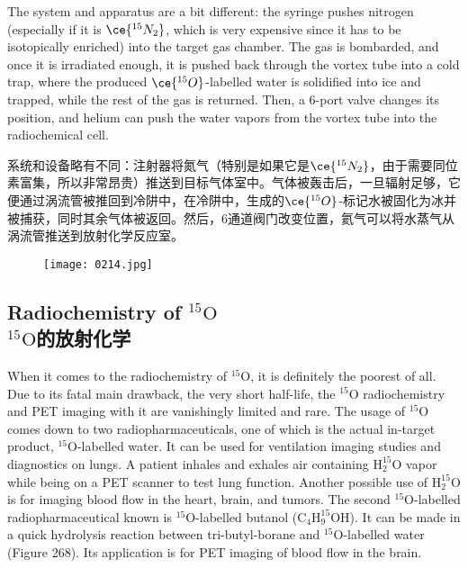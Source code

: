 \documentclass[dvipsnames, svgnames,a4paper,11pt]{article}
\begin{document}
The system and apparatus are a bit different: the syringe pushes nitrogen (especially if it is \(\ce{^{15}N_2}\), which is very expensive since it has to be isotopically enriched) into the target gas chamber. The gas is bombarded, and once it is irradiated enough, it is pushed back through the vortex tube into a cold trap, where the produced \(\ce{^{15}O}\)-labelled water is solidified into ice and trapped, while the rest of the gas is returned. Then, a 6-port valve changes its position, and helium can push the water vapors from the vortex tube into the radiochemical cell.

系统和设备略有不同：注射器将氮气（特别是如果它是\(\ce{^{15}N_2}\)，由于需要同位素富集，所以非常昂贵）推送到目标气体室中。气体被轰击后，一旦辐射足够，它便通过涡流管被推回到冷阱中，在冷阱中，生成的\(\ce{^{15}O}\)-标记水被固化为冰并被捕获，同时其余气体被返回。然后，6通道阀门改变位置，氦气可以将水蒸气从涡流管推送到放射化学反应室。

\begin{figure}[h]
	\centering
    \texttt{[image: 0214.jpg]}  
     \label{fig267}
\end{figure}

\subsection{Radiochemistry of \(\mathrm{^{15}O}\)\\ \(\mathrm{^{15}O}\)的放射化学}  
When it comes to the radiochemistry of \(\mathrm{^{15}O}\), it is definitely the poorest of all. Due to its fatal main drawback, the very short half-life, the \(\mathrm{^{15}O}\) radiochemistry and PET imaging with it are vanishingly limited and rare. The usage of \(\mathrm{^{15}O}\) comes down to two radiopharmaceuticals, one of which is the actual in-target product, \(\mathrm{^{15}O}\)-labelled water. It can be used for ventilation imaging studies and diagnostics on lungs. A patient inhales and exhales air containing \(\mathrm{H_{2}^{15}O}\) vapor while being on a PET scanner to test lung function. Another possible use of \(\mathrm{H_{2}^{15}O}\) is for imaging blood flow in the heart, brain, and tumors. The second \(\mathrm{^{15}O}\)-labelled radiopharmaceutical known is \(\mathrm{^{15}O}\)-labelled butanol (\(\mathrm{C_4H_9^{15}OH}\)). It can be made in a quick hydrolysis reaction between tri-butyl-borane and \(\mathrm{^{15}O}\)-labelled water (Figure 268). Its application is for PET imaging of blood flow in the brain.
\end{document}
